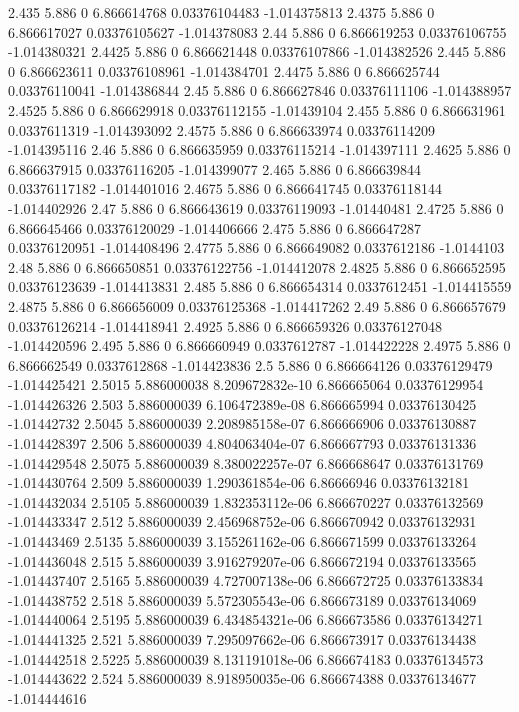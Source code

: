 {2.435 5.886 0 6.866614768 0.03376104483 -1.014375813
2.4375 5.886 0 6.866617027 0.03376105627 -1.014378083
2.44 5.886 0 6.866619253 0.03376106755 -1.014380321
2.4425 5.886 0 6.866621448 0.03376107866 -1.014382526
2.445 5.886 0 6.866623611 0.03376108961 -1.014384701
2.4475 5.886 0 6.866625744 0.03376110041 -1.014386844
2.45 5.886 0 6.866627846 0.03376111106 -1.014388957
2.4525 5.886 0 6.866629918 0.03376112155 -1.01439104
2.455 5.886 0 6.866631961 0.0337611319 -1.014393092
2.4575 5.886 0 6.866633974 0.03376114209 -1.014395116
2.46 5.886 0 6.866635959 0.03376115214 -1.014397111
2.4625 5.886 0 6.866637915 0.03376116205 -1.014399077
2.465 5.886 0 6.866639844 0.03376117182 -1.014401016
2.4675 5.886 0 6.866641745 0.03376118144 -1.014402926
2.47 5.886 0 6.866643619 0.03376119093 -1.01440481
2.4725 5.886 0 6.866645466 0.03376120029 -1.014406666
2.475 5.886 0 6.866647287 0.03376120951 -1.014408496
2.4775 5.886 0 6.866649082 0.0337612186 -1.0144103
2.48 5.886 0 6.866650851 0.03376122756 -1.014412078
2.4825 5.886 0 6.866652595 0.03376123639 -1.014413831
2.485 5.886 0 6.866654314 0.0337612451 -1.014415559
2.4875 5.886 0 6.866656009 0.03376125368 -1.014417262
2.49 5.886 0 6.866657679 0.03376126214 -1.014418941
2.4925 5.886 0 6.866659326 0.03376127048 -1.014420596
2.495 5.886 0 6.866660949 0.0337612787 -1.014422228
2.4975 5.886 0 6.866662549 0.0337612868 -1.014423836
2.5 5.886 0 6.866664126 0.03376129479 -1.014425421
2.5015 5.886000038 8.209672832e-10 6.866665064 0.03376129954 -1.014426326
2.503 5.886000039 6.106472389e-08 6.866665994 0.03376130425 -1.01442732
2.5045 5.886000039 2.208985158e-07 6.866666906 0.03376130887 -1.014428397
2.506 5.886000039 4.804063404e-07 6.866667793 0.03376131336 -1.014429548
2.5075 5.886000039 8.380022257e-07 6.866668647 0.03376131769 -1.014430764
2.509 5.886000039 1.290361854e-06 6.86666946 0.03376132181 -1.014432034
2.5105 5.886000039 1.832353112e-06 6.866670227 0.03376132569 -1.014433347
2.512 5.886000039 2.456968752e-06 6.866670942 0.03376132931 -1.01443469
2.5135 5.886000039 3.155261162e-06 6.866671599 0.03376133264 -1.014436048
2.515 5.886000039 3.916279207e-06 6.866672194 0.03376133565 -1.014437407
2.5165 5.886000039 4.727007138e-06 6.866672725 0.03376133834 -1.014438752
2.518 5.886000039 5.572305543e-06 6.866673189 0.03376134069 -1.014440064
2.5195 5.886000039 6.434854321e-06 6.866673586 0.03376134271 -1.014441325
2.521 5.886000039 7.295097662e-06 6.866673917 0.03376134438 -1.014442518
2.5225 5.886000039 8.131191018e-06 6.866674183 0.03376134573 -1.014443622
2.524 5.886000039 8.918950035e-06 6.866674388 0.03376134677 -1.014444616
}
